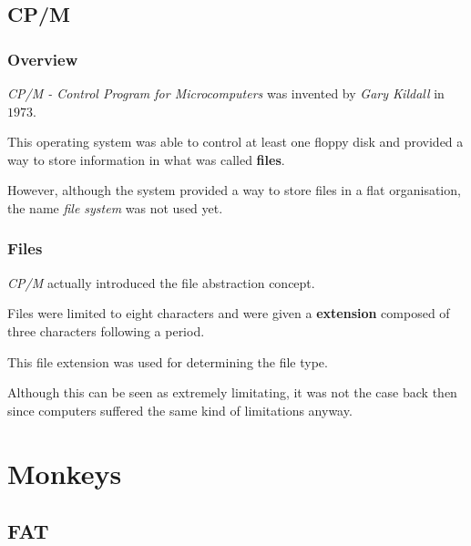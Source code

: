 
\subsection{CP/M}


\begin{frame}
  \frametitle{Overview}

  \textit{CP/M - Control Program for Microcomputers} was invented by
  \textit{Gary Kildall} in $1973$.

  \-

  This operating system was able to control at least one floppy disk
  and provided a way to store information in what was called \textbf{files}.

  \-

  However, although the system provided a way to store files in a flat
  organisation, the name \textit{file system} was not used yet.
\end{frame}


\begin{frame}
  \frametitle{Files}

  \textit{CP/M} actually introduced the file abstraction concept.

  \-

  Files were limited to eight characters and were given a \textbf{extension}
  composed of three characters following a period.

  \-

  This file extension was used for determining the file type.

  \-

  Although this can be seen as extremely limitating, it was not the case
  back then since computers suffered the same kind of limitations anyway.
\end{frame}

%
%

\section{Monkeys}


\subsection{FAT}


